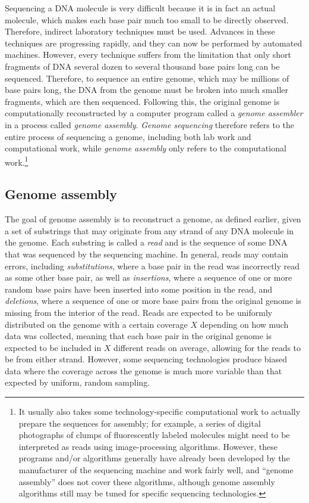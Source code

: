 \documentclass[10pt]{article}
\begin{document}
Sequencing a DNA molecule is very difficult because it is in fact an actual
molecule, which makes each base pair much too small to be directly observed.
Therefore, indirect laboratory techniques must be used.  Advances in these
techniques are progressing rapidly, and they can now be performed by automated
machines.  However, every technique suffers from the limitation that only short
fragments of DNA several dozen to several thousand base pairs long can be
sequenced.  Therefore, to sequence an entire genome, which may be millions of
base pairs long, the DNA from the genome must be broken into much smaller
fragments, which are then sequenced.  Following this, the original genome is
computationally reconstructed by a computer program called a {\it genome
assembler} in a process called {\it genome assembly}.  {\it Genome sequencing}
therefore refers to the entire process of sequencing a genome, including both
lab work and computational work, while {\it genome assembly} only refers to the
computational work.\footnote{It usually also takes some technology-specific
computational work to actually prepare the sequences for assembly; for example,
a series of digital photographs of clumps of fluorescently labeled molecules
might need to be interpreted as reads using image-processing algorithms.
However, these programs and/or algorithms generally have already been developed
by the manufacturer of the sequencing machine and work fairly well, and ``genome
assembly'' does not cover these algorithms, although genome assembly algorithms
still may be tuned for specific sequencing technologies.}

\subsection{Genome assembly}

\label{subsec:reads}

The goal of genome assembly is to reconstruct a genome, as defined earlier,
given a set of substrings that may originate from any strand of any DNA molecule
in the genome.  Each substring is called a {\it read} and is the sequence of
some DNA that was sequenced by the sequencing machine.  In general, reads may
contain errors, including {\it substitutions}, where a base pair in the read was
incorrectly read as some other base pair, as well as {\it insertions}, where a
sequence of one or more random base pairs have been inserted into some position
in the read, and {\it deletions}, where a sequence of one or more base pairs
from the original genome is missing from the interior of the read.  Reads are
expected to be uniformly distributed on the genome with a certain coverage $X$
depending on how much data was collected, meaning that each base pair in the
original genome is expected to be included in $X$ different reads on average,
allowing for the reads to be from either strand.  However, some sequencing
technologies produce biased data where the coverage across the genome is much
more variable than that expected by uniform, random sampling.
\end{document}
